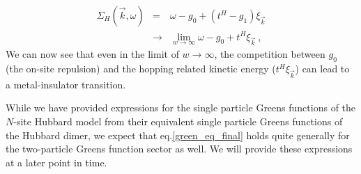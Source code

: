 \documentclass[12pt]{article}
\numberwithin{equation}{section}
\begin{document}
\begin{eqnarray}
\Sigma_{H} (\vec{k},\omega) &=& \omega - g_{0} + (t^{H} - g_{1})\xi_{\vec{k}}\nonumber\\
&\to & \lim_{w\to\infty} \omega - {g}_{0} + t^{H}\xi_{\vec{k}}~,
\end{eqnarray}
We can now see that even in the limit of $w\to\infty$, the competition between ${g}_{0}$ (the on-site repulsion) and the hopping related kinetic energy ($t^{H}\xi_{\vec{k}}$) can lead to a metal-insulator transition.
\par\noindent
While we have provided expressions for the single particle Greens functions of the $N$-site Hubbard model from their equivalent single particle Greens functions of the Hubbard dimer, we expect that eq.\eqref{green_eq_final} holds quite generally for the two-particle Greens function sector as well. We will provide these expressions at a later point in time. 
\newpage
\end{document}
